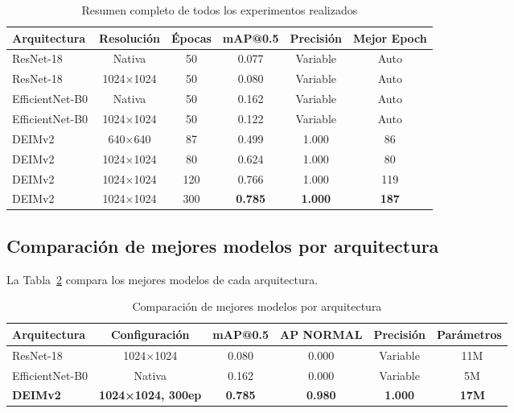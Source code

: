 \begin{table}[htbp]
\centering
\small
\begin{tabular}{lccccc}
\toprule
\textbf{Arquitectura} & \textbf{Resolución} & \textbf{Épocas} & \textbf{mAP@0.5} & \textbf{Precisión} & \textbf{Mejor Epoch} \\
\midrule
ResNet-18 & Nativa & 50 & 0.077 & Variable & Auto \\
ResNet-18 & 1024×1024 & 50 & 0.080 & Variable & Auto \\
\midrule
EfficientNet-B0 & Nativa & 50 & 0.162 & Variable & Auto \\
EfficientNet-B0 & 1024×1024 & 50 & 0.122 & Variable & Auto \\
\midrule
DEIMv2 & 640×640 & 87 & 0.499 & 1.000 & 86 \\
DEIMv2 & 1024×1024 & 80 & 0.624 & 1.000 & 80 \\
DEIMv2 & 1024×1024 & 120 & 0.766 & 1.000 & 119 \\
DEIMv2 & 1024×1024 & 300 & \textbf{0.785} & \textbf{1.000} & \textbf{187} \\
\bottomrule
\end{tabular}
\caption{Resumen completo de todos los experimentos realizados}
\label{tab:resumen_experimentos}
\end{table}

\subsection{Comparación de mejores modelos por arquitectura}

La Tabla~\ref{tab:mejores_modelos} compara los mejores modelos de cada arquitectura.

\begin{table}[htbp]
\centering
\begin{tabular}{lccccc}
\toprule
\textbf{Arquitectura} & \textbf{Configuración} & \textbf{mAP@0.5} & \textbf{AP NORMAL} & \textbf{Precisión} & \textbf{Parámetros} \\
\midrule
ResNet-18 & 1024×1024 & 0.080 & 0.000 & Variable & ~11M \\
EfficientNet-B0 & Nativa & 0.162 & 0.000 & Variable & ~5M \\
\textbf{DEIMv2} & \textbf{1024×1024, 300ep} & \textbf{0.785} & \textbf{0.980} & \textbf{1.000} & \textbf{~17M} \\
\bottomrule
\end{tabular}
\caption{Comparación de mejores modelos por arquitectura}
\label{tab:mejores_modelos}
\end{table}

